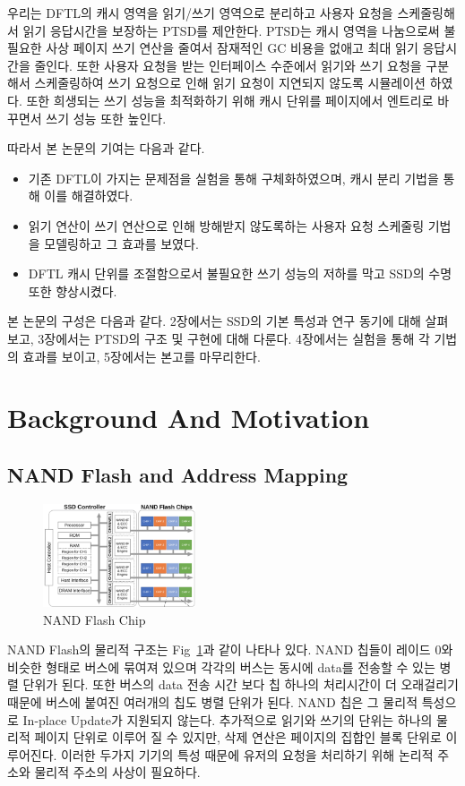 \documentclass[conference]{IEEEtran}
\begin{document}
우리는 DFTL의 캐시 영역을 읽기/쓰기 영역으로 분리하고 사용자 요청을 스케줄링해서 읽기 응답시간을 보장하는
PTSD를 제안한다. PTSD는 캐시 영역을 나눔으로써 불필요한 사상 페이지 쓰기 연산을 줄여서 잠재적인 GC 비용을 없애고
최대 읽기 응답시간을 줄인다. 또한 사용자 요청을 받는 인터페이스 수준에서 읽기와 쓰기 요청을 구분해서 스케줄링하여
쓰기 요청으로 인해 읽기 요청이 지연되지 않도록 시뮬레이션 하였다. 또한 희생되는 쓰기 성능을 최적화하기 위해
캐시 단위를 페이지에서 엔트리로 바꾸면서 쓰기 성능 또한 높인다. \par

따라서 본 논문의 기여는 다음과 같다.
\begin{itemize}
	\item{기존 DFTL이 가지는 문제점을 실험을 통해 구체화하였으며, 캐시 분리 기법을 통해 이를 해결하였다.}
	\item{읽기 연산이 쓰기 연산으로 인해 방해받지 않도록하는 사용자 요청 스케줄링 기법을 모델링하고 그 효과를 보였다.}
	\item{DFTL 캐시 단위를 조절함으로서 불필요한 쓰기 성능의 저하를 막고 SSD의 수명 또한 향상시켰다.}
\end{itemize}
\par

본 논문의 구성은 다음과 같다. 2장에서는 SSD의 기본 특성과 연구 동기에 대해 살펴보고, 3장에서는 PTSD의 구조 및
구현에 대해 다룬다. 4장에서는 실험을 통해 각 기법의 효과를 보이고, 5장에서는 본고를 마무리한다.


\section{Background And Motivation}
\subsection{NAND Flash and Address Mapping}
\begin{figure}[h]
	\centering
	\includegraphics[width=0.4\textwidth]{image/bg/chips.png}
	\caption{NAND Flash Chip \cite{b1}}
	\label{fig:chips}
\end{figure}
NAND Flash의 물리적 구조는 Fig~\ref{fig:chips}과 같이 나타나 있다. NAND 칩들이 레이드 0와 비슷한
형태로 버스에 묶여져 있으며 각각의 버스는 동시에 data를 전송할 수 있는 병렬 단위가 된다.
또한 버스의 data 전송 시간 보다 칩 하나의 처리시간이 더 오래걸리기 때문에 버스에 붙여진 여러개의 칩도
병렬 단위가 된다. NAND 칩은 그 물리적 특성으로 In-place Update가 지원되지 않는다. 추가적으로
읽기와 쓰기의 단위는 하나의 물리적 페이지 단위로 이루어 질 수 있지만, 삭제 연산은 페이지의 집합인
블록 단위로 이루어진다. 이러한 두가지 기기의 특성 때문에 유저의 요청을 처리하기 위해
논리적 주소와 물리적 주소의 사상이 필요하다. \par
\end{document}

